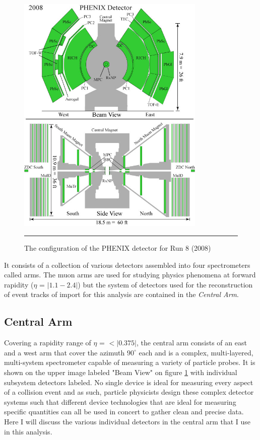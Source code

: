 \begin{figure}[htbp]
  \centering
    \includegraphics[width=0.8\textwidth]{Figures/Phenix_2008.jpg}
    \rule{35em}{0.5pt}
  \caption[PHENIX Detector Configuration for RHIC Run 8 (2008)]{The configuration of the PHENIX detector for Run 8 (2008)}
  \label{fig:run8config}
\end{figure}
It consists of a collection of various detectors assembled into four spectrometers called arms. The muon arms are used for studying physics phenomena at forward rapidity ($\eta$ = $|1.1-2.4|$)\citep{rapidityref} but the system of detectors used for the reconstruction of event tracks of import for this analysis are contained in the \textit{Central Arm}.  

\subsection{Central Arm}
Covering a rapidity range of $\eta$ = $<|0.375|$, the central arm consists of an east and a west arm that cover the azimuth $90^{\circ}$ each \citep{EMCfocus}and is a complex, multi-layered, multi-system spectrometer capable of measuring a variety of particle probes. It is shown on the upper image labeled "Beam View" on figure \ref{fig:run8config} with individual subsystem detectors labeled. No single device is ideal for measuring every aspect of a collision event and as such, particle physicists design these complex detector systems such that different device technologies that are ideal for measuring specific quantities can all be used in concert to gather clean and precise data. Here I will discuss the various individual detectors in the central arm that I use in this analysis.

